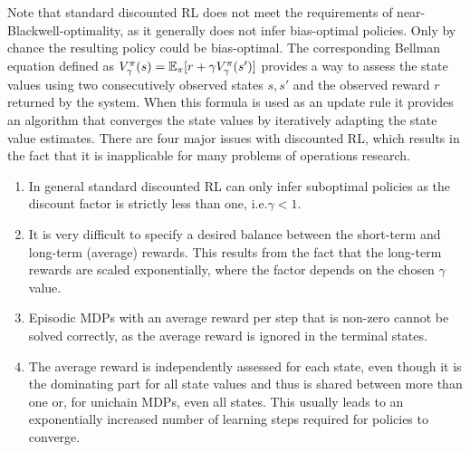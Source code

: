 \documentclass[envcountsame]{llncs}
\begin{document}
Note that standard discounted RL does not meet the requirements of near-Blackwell-optimality, as it
generally does not infer bias-optimal policies. Only by chance the resulting policy could be
bias-optimal.
%
%
%
The corresponding Bellman equation defined as
\(V_{\gamma}^{\pi}(s) = \operatorname*{\mathbb{E}}_{\pi}[r + \gamma V_{\gamma}^{\pi}(s')]\) \citep[see
e.g.][p.70]{sutton1998introduction} provides a way to assess the state values using two
consecutively observed states \(s, s'\) and the observed reward \(r\) returned by the system. When
this formula is used as an update rule it provides an algorithm that converges the state values by
iteratively adapting the state value estimates.
%
There are four major issues with discounted RL, which results in the fact that it is inapplicable
for many problems of operations research.


\begin{enumerate}
\item In general standard discounted RL can only infer suboptimal policies as the discount factor is
  strictly less than one, i.e.\@ \(\gamma < 1\).
\item It is very difficult to specify a desired balance between the short-term and long-term
  (average) rewards. This results from the fact that the long-term rewards are scaled exponentially,
  where the factor depends on the chosen \(\gamma\) value.
\item Episodic MDPs with an average reward per step that is non-zero cannot be solved correctly, as
  the average reward is ignored in the terminal states.
\item The average reward is independently assessed for each state, even though it is the dominating
  part for all state values and thus is shared between more than one or, for unichain MDPs, even all
  states. This usually leads to an exponentially increased number of learning steps required for
  policies to converge.
\end{enumerate}
\end{document}
